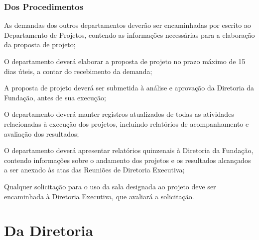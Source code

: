         \subsubsection{Dos Procedimentos}
        \begin{enumerate}
            \item As demandas dos outros departamentos deverão ser encaminhadas por escrito ao Departamento de Projetos, contendo as informações necessárias para a elaboração da proposta de projeto;
            \item O departamento deverá elaborar a proposta de projeto no prazo máximo de 15 dias úteis, a contar do recebimento da demanda;
            \item A proposta de projeto deverá ser submetida à análise e aprovação da Diretoria da Fundação, antes de sua execução;
            \item O departamento deverá manter registros atualizados de todas as atividades relacionadas à execução dos projetos, incluindo relatórios de acompanhamento e avaliação dos resultados;
            \item O departamento deverá apresentar relatórios quinzenais à Diretoria da Fundação, contendo informações sobre o andamento dos projetos e os resultados alcançados a ser anexado às atas das Reuniões de Diretoria Executiva;
            {\color{red} 
            \item Qualquer solicitação para o uso da sala designada ao projeto deve ser encaminhada à Diretoria Executiva, que avaliará a solicitação.
            }
        \end{enumerate}
        
\section{Da Diretoria}
